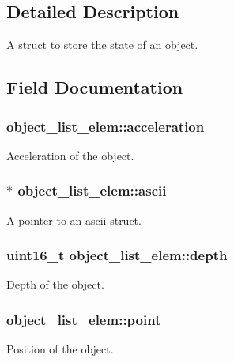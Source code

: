 \subsection{Detailed Description}
A struct to store the state of an object. 

\subsection{Field Documentation}
\subsubsection[{\texorpdfstring{acceleration}{acceleration}}]{ object\+\_\+list\+\_\+elem\+::acceleration}\hypertarget{structobject__list__elem_a5bd8bb21c8d8b0d7b86e10773617ad55}{}\label{structobject__list__elem_a5bd8bb21c8d8b0d7b86e10773617ad55}
Acceleration of the object. 
\subsubsection[{\texorpdfstring{ascii}{ascii}}]{$\ast$ object\+\_\+list\+\_\+elem\+::ascii}\hypertarget{structobject__list__elem_ab490a018acd1306da39712322fa48597}{}\label{structobject__list__elem_ab490a018acd1306da39712322fa48597}
A pointer to an ascii struct. 
\subsubsection[{\texorpdfstring{depth}{depth}}]{\setlength{\rightskip}{0pt plus 5cm}uint16\+\_\+t object\+\_\+list\+\_\+elem\+::depth}\hypertarget{structobject__list__elem_ae5eb9e7b299437926de262dcc70de47e}{}\label{structobject__list__elem_ae5eb9e7b299437926de262dcc70de47e}
Depth of the object. 
\subsubsection[{\texorpdfstring{point}{point}}]{ object\+\_\+list\+\_\+elem\+::point}\hypertarget{structobject__list__elem_a5e2e6e97dc9763c6713838d6f36fa0ba}{}\label{structobject__list__elem_a5e2e6e97dc9763c6713838d6f36fa0ba}
Position of the object. 

